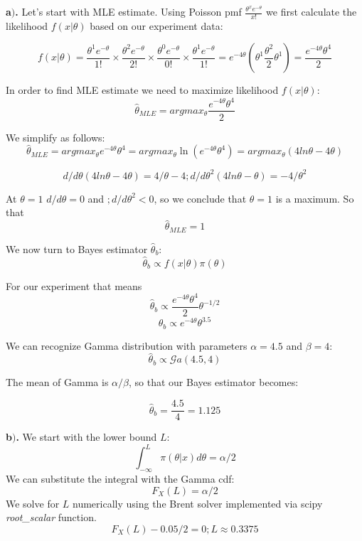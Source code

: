 \documentclass[a4 paper]{article}
\begin{document}
	







\textbf{a$)$.} Let's start with MLE estimate.
Using Poisson pmf $\frac{\theta^{x} e^{-\theta}}{x !}$
we first calculate the likelihood $f(x|\theta)$
based on our experiment data:

$$
f(x|\theta) = \frac{\theta^{1}e^{-\theta}}{1!}\times\frac{\theta^{2}e^{-\theta}}{2!}\times\frac{\theta^{0}e^{-\theta}}{0!}\times\frac{\theta^{1}e^{-\theta}}{1!}=e^{-4\theta}\left(\theta^{1}\frac{\theta^{2}}{2}\theta^{1}\right)=\frac{e^{-4\theta}\theta^{4}}{2}
$$

In order to find MLE estimate we need to maximize 
likelihood $f(x|\theta)$:
$$
\hat{\theta}_{MLE}=argmax_{\theta}\frac{e^{-4\theta}\theta^{4}}{2}
$$

We simplify as follows:
$$
\hat{\theta}_{MLE}=argmax_{\theta}e^{-4\theta}\theta^{4}=argmax{}_{\theta}\ln\left(e^{-4\theta}\theta^{4}\right)=argmax_{\theta}\left(4ln\theta-4\theta\right)
$$

$$
d/d\theta\left(4ln\theta-4\theta\right)=4/\theta-4;d/d\theta^{2}\left(4ln\theta-\theta\right)=-4/\theta^{2}
$$

At $\theta=1$ $d/d\theta=0$ and $;d/d\theta^{2}<0$, so we 
conclude that  $\theta=1$ is a maximum. So that 
$$
\hat{\theta}_{MLE}=1
$$

We now turn to Bayes estimator $\hat{\theta}_b$:
$$
\hat{\theta}_{b}\propto f(x|\theta)\pi(\theta)
$$

For our experiment that means
$$
\hat{\theta}_{b}\propto\frac{e^{-4\theta}\theta^{4}}{2}\theta^{-1/2}
$$
$$
\hat{\theta}_{b}\propto e^{-4\theta}\theta^{3.5}
$$

We can recognize Gamma distribution 
with parameters $\alpha=4.5$ and $\beta=4$:
$$
\hat{\theta}_{b}\propto \mathcal{G}a\left(4.5,4\right)
$$

The mean of Gamma is $\alpha/\beta$, so that 
our Bayes estimator becomes:

$$
\hat{\theta}_{b}=\frac{4.5}{4}=1.125
$$






\textbf{b$)$.} We start with the lower bound $L$:
$$
\int_{-\infty}^{L} \pi(\theta | x) d \theta=\alpha / 2
$$
We can substitute the integral with the Gamma cdf:
$$
F_{X}(L) =\alpha / 2
$$
We solve for $L$ numerically using the Brent solver 
implemented via scipy \textit{root\_scalar} function. 
$$
F_{X}(L) - 0.05 / 2 = 0; L\approx 0.3375 
$$
\end{document}
